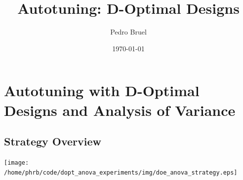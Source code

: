 \documentclass[final,12pt,a4paper]{article}
\author{Pedro Bruel}
\date{\today}
\title{Autotuning: D-Optimal Designs}
\begin{document}
\maketitle
\tableofcontents


\section{Autotuning with D-Optimal Designs and Analysis of Variance}
\label{sec:orgc17a684}
\subsection{Strategy Overview}
\label{sec:org158fa31}
\begin{center}
\texttt{[image: /home/phrb/code/dopt\_anova\_experiments/img/doe\_anova\_strategy.eps]}
\end{center}
\end{document}
